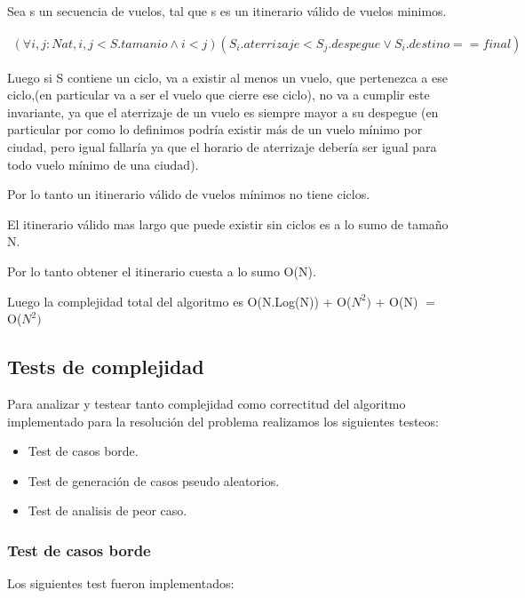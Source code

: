 Sea s un secuencia de vuelos, tal que s es un itinerario v\'alido de vuelos minimos.

\begin{align*}
(\forall i,j:Nat, i,j<S.tamanio \wedge i<j)(S_{i}.aterrizaje < S_{j}.despegue
\vee S_{i}.destino == final)
\end{align*}

Luego si S contiene un ciclo, va a existir al menos un vuelo, que pertenezca a ese ciclo,(en particular va a ser el vuelo que cierre ese ciclo), no va a cumplir este invariante, ya que el aterrizaje de un vuelo es siempre mayor a su despegue (en particular por como lo definimos podr\'ia existir m\'as de un vuelo m\'inimo por ciudad, pero igual fallar\'ia ya que el horario de aterrizaje deber\'ia ser igual para todo vuelo m\'inimo de una ciudad).

Por lo tanto un itinerario v\'alido de vuelos m\'inimos no tiene ciclos. 

El itinerario v\'alido mas largo que puede existir sin ciclos es a lo sumo de tamaño N.

Por lo tanto obtener el itinerario cuesta a lo sumo O(N).


Luego la complejidad total del algoritmo es O(N.Log(N)) + O($N^{2})$ + O(N) $=$ O($N^{2})$
\subsection{Tests de complejidad}

Para analizar y testear tanto complejidad como correctitud del algoritmo implementado para la resoluci\'on del problema  realizamos los siguientes testeos:

\begin{itemize}
  \item Test de casos borde.
  \item Test de generaci\'on de casos pseudo aleatorios.
  \item Test de analisis de peor caso.
\end{itemize}

\newpage

\subsubsection{Test de casos borde}


Los siguientes test fueron implementados:

